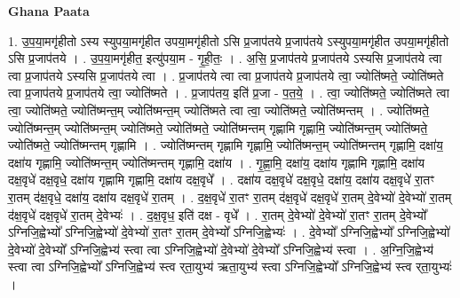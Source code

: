 \documentclass[17pt]{extarticle}
\begin{document}
\textbf{Ghana Paata } \newline

1. उ॒प॒या॒मगृ॑हीतो ऽस्य स्युपया॒मगृ॑हीत उपया॒मगृ॑हीतो ऽसि प्र॒जाप॑तये प्र॒जाप॑तये ऽस्युपया॒मगृ॑हीत उपया॒मगृ॑हीतो ऽसि प्र॒जाप॑तये । . उ॒प॒या॒मगृ॑हीत॒ इत्यु॑पया॒म - गृ॒ही॒तः॒ । . अ॒सि॒ प्र॒जाप॑तये प्र॒जाप॑तये ऽस्यसि प्र॒जाप॑तये त्वा त्वा प्र॒जाप॑तये ऽस्यसि प्र॒जाप॑तये त्वा । . प्र॒जाप॑तये त्वा त्वा प्र॒जाप॑तये प्र॒जाप॑तये त्वा॒ ज्योति॑ष्मते॒ ज्योति॑ष्मते त्वा प्र॒जाप॑तये प्र॒जाप॑तये त्वा॒ ज्योति॑ष्मते । . प्र॒जाप॑तय॒ इति॑ प्र॒जा - प॒त॒ये॒ । . त्वा॒ ज्योति॑ष्मते॒ ज्योति॑ष्मते त्वा त्वा॒ ज्योति॑ष्मते॒ ज्योति॑ष्मन्त॒म् ज्योति॑ष्मन्त॒म् ज्योति॑ष्मते त्वा त्वा॒ ज्योति॑ष्मते॒ ज्योति॑ष्मन्तम् । . ज्योति॑ष्मते॒ ज्योति॑ष्मन्त॒म् ज्योति॑ष्मन्त॒म् ज्योति॑ष्मते॒ ज्योति॑ष्मते॒ ज्योति॑ष्मन्तम् गृह्णामि गृह्णामि॒ ज्योति॑ष्मन्त॒म् ज्योति॑ष्मते॒ ज्योति॑ष्मते॒ ज्योति॑ष्मन्तम् गृह्णामि । . ज्योति॑ष्मन्तम् गृह्णामि गृह्णामि॒ ज्योति॑ष्मन्त॒म् ज्योति॑ष्मन्तम् गृह्णामि॒ दक्षा॑य॒ दक्षा॑य गृह्णामि॒ ज्योति॑ष्मन्त॒म् ज्योति॑ष्मन्तम् गृह्णामि॒ दक्षा॑य । . गृ॒ह्णा॒मि॒ दक्षा॑य॒ दक्षा॑य गृह्णामि गृह्णामि॒ दक्षा॑य दक्ष॒वृधे॑ दक्ष॒वृधे॒ दक्षा॑य गृह्णामि गृह्णामि॒ दक्षा॑य दक्ष॒वृधे᳚ । . दक्षा॑य दक्ष॒वृधे॑ दक्ष॒वृधे॒ दक्षा॑य॒ दक्षा॑य दक्ष॒वृधे॑ रा॒तꣳ रा॒तम् द॑क्ष॒वृधे॒ दक्षा॑य॒ दक्षा॑य दक्ष॒वृधे॑ रा॒तम् । . द॒क्ष॒वृधे॑ रा॒तꣳ रा॒तम् द॑क्ष॒वृधे॑ दक्ष॒वृधे॑ रा॒तम् दे॒वेभ्यो॑ दे॒वेभ्यो॑ रा॒तम् द॑क्ष॒वृधे॑ दक्ष॒वृधे॑ रा॒तम् दे॒वेभ्यः॑ । . द॒क्ष॒वृध॒ इति॑ दक्ष - वृधे᳚ । . रा॒तम् दे॒वेभ्यो॑ दे॒वेभ्यो॑ रा॒तꣳ रा॒तम् दे॒वेभ्यो᳚ ऽग्निजि॒ह्वेभ्यो᳚ ऽग्निजि॒ह्वेभ्यो॑ दे॒वेभ्यो॑ रा॒तꣳ रा॒तम् दे॒वेभ्यो᳚ ऽग्निजि॒ह्वेभ्यः॑ । . दे॒वेभ्यो᳚ ऽग्निजि॒ह्वेभ्यो᳚ ऽग्निजि॒ह्वेभ्यो॑ दे॒वेभ्यो॑ दे॒वेभ्यो᳚ ऽग्निजि॒ह्वेभ्य॑ स्त्वा त्वा ऽग्निजि॒ह्वेभ्यो॑ दे॒वेभ्यो॑ दे॒वेभ्यो᳚ ऽग्निजि॒ह्वेभ्य॑ स्त्वा । . अ॒ग्नि॒जि॒ह्वेभ्य॑ स्त्वा त्वा ऽग्निजि॒ह्वेभ्यो᳚ ऽग्निजि॒ह्वेभ्य॑ स्त्व र्‌ता॒युभ्य॑ ऋता॒युभ्य॑ स्त्वा ऽग्निजि॒ह्वेभ्यो᳚ ऽग्निजि॒ह्वेभ्य॑ स्त्व र्‌ता॒युभ्यः॑ । \newline
\end{document}
